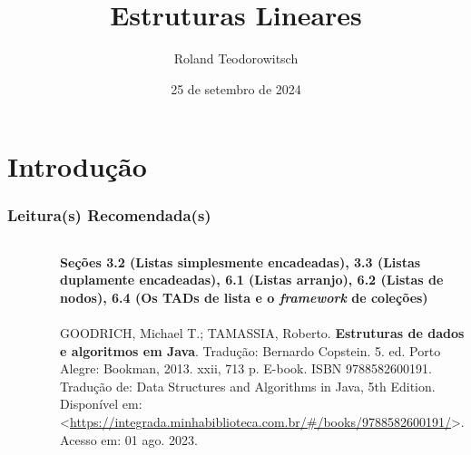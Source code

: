 \documentclass[aspectratio=169]{beamer}
\title[\sc{Estruturas Lineares}]{Estruturas Lineares}
\author[Roland Teodorowitsch]{Roland Teodorowitsch}
\institute[ALEST I - EP - PUCRS]{Algoritmos e Estruturas de Dados I - Escola Politécnica - PUCRS}
\date{25 de setembro de 2024}
\begin{document}
\justifying

\begin{frame}
	\titlepage
\end{frame}

\section{Introdução}

\begin{frame}\frametitle{Leitura(s) Recomendada(s)}

\begin{columns}[T]
\begin{column}{0.15\linewidth}
\vspace{-3mm}
\begin{figure}[h]
	\centering
	\includegraphics[height=0.3\paperheight]{imagens/livro_goodrich.jpg}
\end{figure}
\end{column}
\begin{column}{0.85\linewidth}
\tiny{\textbf{Seções 3.2 (Listas simplesmente encadeadas), 3.3 (Listas duplamente encadeadas), 6.1 (Listas arranjo), 6.2 (Listas de nodos), 6.4 (Os TADs de lista e o \emph{framework} de coleções)}\\
~}\\
\scriptsize{GOODRICH, Michael T.; TAMASSIA, Roberto. \textbf{Estruturas de dados e algoritmos em Java}. Tradução: Bernardo Copstein. 5. ed. Porto Alegre: Bookman, 2013. xxii, 713 p. E-book. ISBN 9788582600191. Tradução de: Data Structures and Algorithms in Java, 5th Edition. Disponível em: \textless{}\url{https://integrada.minhabiblioteca.com.br/\#/books/9788582600191/}\textgreater{}. Acesso em: 01 ago. 2023.}
\end{column}
\end{columns}

\end{frame}
\end{document}
